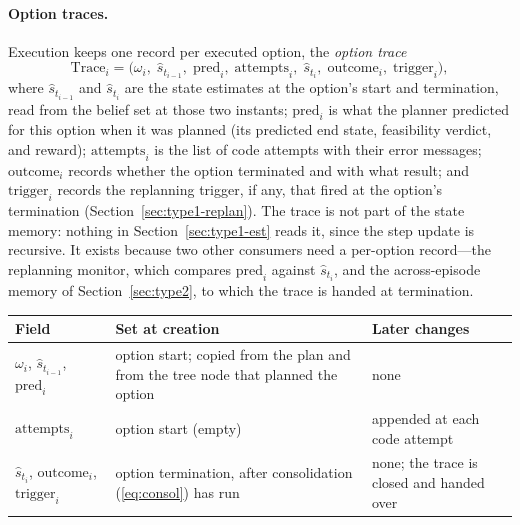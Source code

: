 \documentclass[11pt]{article}
\makeatletter
\newcommand{\shat}{\hat{s}}
\newcommand{\Trace}{\mathrm{Trace}}
\newenvironment{lifecycle}{\begin{center}\small\begin{tabular}{@{}>{\raggedright\arraybackslash}p{0.17\textwidth}>{\raggedright\arraybackslash}p{0.36\textwidth}>{\raggedright\arraybackslash}p{0.40\textwidth}@{}}\toprule Field & Set at creation & Later changes \\ \midrule}{\bottomrule\end{tabular}\end{center}}
\makeatother
\begin{document}
\paragraph{Option traces.}
Execution keeps one record per executed option, the \emph{option trace}
\begin{equation}
\Trace_i=\big(\omega_i,\;\shat_{t_{i-1}},\;\mathrm{pred}_i,\;\mathrm{attempts}_i,\;\shat_{t_i},\;\mathrm{outcome}_i,\;\mathrm{trigger}_i\big),
\label{eq:trace}
\end{equation}
where $\shat_{t_{i-1}}$ and $\shat_{t_i}$ are the state estimates at the option's start and termination, read from the belief set at those two instants; $\mathrm{pred}_i$ is what the planner predicted for this option when it was planned (its predicted end state, feasibility verdict, and reward); $\mathrm{attempts}_i$ is the list of code attempts with their error messages; $\mathrm{outcome}_i$ records whether the option terminated and with what result; and $\mathrm{trigger}_i$ records the replanning trigger, if any, that fired at the option's termination (Section~\ref{sec:type1-replan}). The trace is not part of the state memory: nothing in Section~\ref{sec:type1-est} reads it, since the step update is recursive. It exists because two other consumers need a per-option record---the replanning monitor, which compares $\mathrm{pred}_i$ against $\shat_{t_i}$, and the across-episode memory of Section~\ref{sec:type2}, to which the trace is handed at termination.

\begin{lifecycle}
$\omega_i$, $\shat_{t_{i-1}}$, $\mathrm{pred}_i$ & option start; copied from the plan and from the tree node that planned the option & none \\
$\mathrm{attempts}_i$ & option start (empty) & appended at each code attempt \\
$\shat_{t_i}$, $\mathrm{outcome}_i$, $\mathrm{trigger}_i$ & option termination, after consolidation (\ref{eq:consol}) has run & none; the trace is closed and handed over \\
\end{lifecycle}
\end{document}
